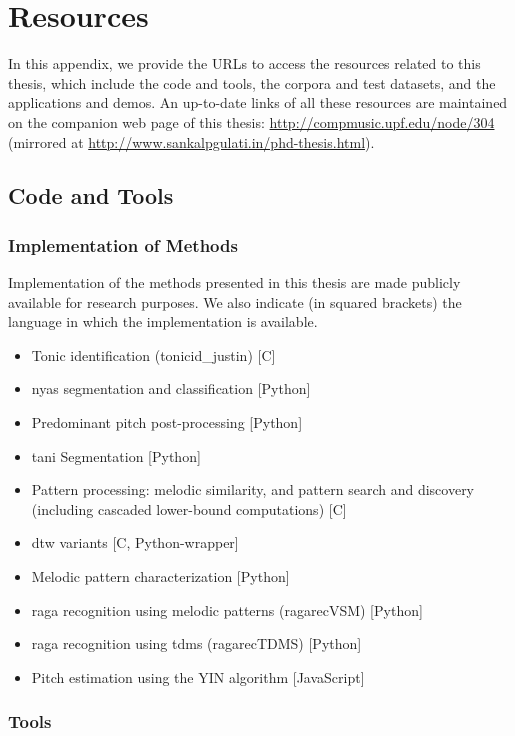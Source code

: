 \chapter{Resources}\label{app:resources}

In this appendix, we provide the URLs to access the resources related to this thesis, which include the code and tools, the corpora and test datasets, and the applications and demos. An up-to-date links of all these resources are maintained on the companion web page of this thesis: \url{http://compmusic.upf.edu/node/304} (mirrored at \url{http://www.sankalpgulati.in/phd-thesis.html}).

\section*{Code and Tools}

\subsection*{Implementation of Methods}
Implementation of the methods presented in this thesis are made publicly available for research purposes. We also indicate (in squared brackets) the language in which the implementation is available.

\begin{itemize}
	\item Tonic identification (\acrshort{tonicid_justin}) [C]
	\item \Gls{nyas} segmentation and classification [Python]
	\item Predominant pitch post-processing [Python]
	\item \Gls{tani} Segmentation [Python]
	\item Pattern processing: melodic similarity, and pattern search and discovery (including cascaded lower-bound computations) [C]
	\item \Gls{dtw} variants [C, Python-wrapper]
	\item Melodic pattern characterization [Python]
	\item \Gls{raga} recognition using melodic patterns (\acrshort{ragarecVSM}) [Python]
	\item \Gls{raga} recognition using \acrshort{tdms} (\acrshort{ragarecTDMS}) [Python]
	\item Pitch estimation using the YIN algorithm [JavaScript]
\end{itemize}

\subsection*{Tools}

